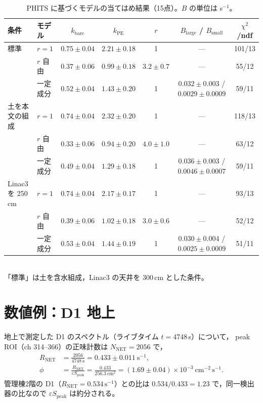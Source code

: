 \documentclass[a4paper,11pt]{ltjsarticle}
\newcommand{\RNET}{R_{\mathrm{NET}}}
\newcommand{\eSpk}{\varepsilon S_{\mathrm{peak}}}
\newcommand{\flux}{\mathrm{cm^{-2}\,s^{-1}}}
\begin{document}
\begin{table}[htbp]
  \centering
  \caption{PHITS に基づくモデルの当てはめ結果（15点）。$B$ の単位は s$^{-1}$。}
  \label{tab:phitsfit}
  \footnotesize
  \setlength{\tabcolsep}{4pt}
  \begin{tabular}{llccccc}
    \toprule
    条件 & モデル & $k_{\mathrm{bare}}$ & $k_{\mathrm{PE}}$ & $r$ & $B_{\mathrm{large}}$ / $B_{\mathrm{small}}$ & $\chi^2$/ndf \\
    \midrule
    標準 & $r=1$ & $0.75\pm0.04$ & $2.21\pm0.18$ & 1 & --- & 101/13 \\
         & $r$ 自由 & $0.37\pm0.06$ & $0.99\pm0.18$ & $3.2\pm0.7$ & --- & 55/12 \\
         & 一定成分 & $0.52\pm0.04$ & $1.43\pm0.20$ & 1 & $0.032\pm0.003$ / $0.0029\pm0.0009$ & 59/11 \\
    \midrule
    土を本文の組成 & $r=1$ & $0.74\pm0.04$ & $2.32\pm0.20$ & 1 & --- & 118/13 \\
         & $r$ 自由 & $0.33\pm0.06$ & $0.94\pm0.20$ & $4.0\pm1.0$ & --- & 63/12 \\
         & 一定成分 & $0.49\pm0.04$ & $1.29\pm0.18$ & 1 & $0.036\pm0.003$ / $0.0046\pm0.0007$ & 59/11 \\
    \midrule
    Linac3 を 250\,cm & $r=1$ & $0.74\pm0.04$ & $2.17\pm0.17$ & 1 & --- & 93/13 \\
         & $r$ 自由 & $0.39\pm0.06$ & $1.02\pm0.18$ & $3.0\pm0.6$ & --- & 52/12 \\
         & 一定成分 & $0.53\pm0.04$ & $1.44\pm0.19$ & 1 & $0.030\pm0.004$ / $0.0025\pm0.0009$ & 51/11 \\
    \bottomrule
  \end{tabular}\\[2pt]
  \footnotesize 「標準」は土を含水組成，Linac3 の天井を 300\,cm とした条件。
\end{table}

\section{数値例：D1 地上}

地上で測定した D1 のスペクトル（ライブタイム $t=4748$\,s）について，
peak ROI（ch 314--366）の正味計数は $N_{\mathrm{NET}}=2056$ で，
\begin{align}
  \RNET &= \frac{2056}{4748\ \mathrm{s}} = 0.433\pm0.011\ \mathrm{s^{-1}}, \\
  \phi &= \frac{\RNET}{\eSpk} = \frac{0.433}{256.3\ \mathrm{cm^2}} = (1.69\pm0.04)\times10^{-3}\ \flux .
\end{align}
管理棟2階の D1（$\RNET=0.534\,\mathrm{s^{-1}}$）との比は $0.534/0.433=1.23$ で，同一検出器の比なので $\eSpk$ は約分される。
\end{document}
